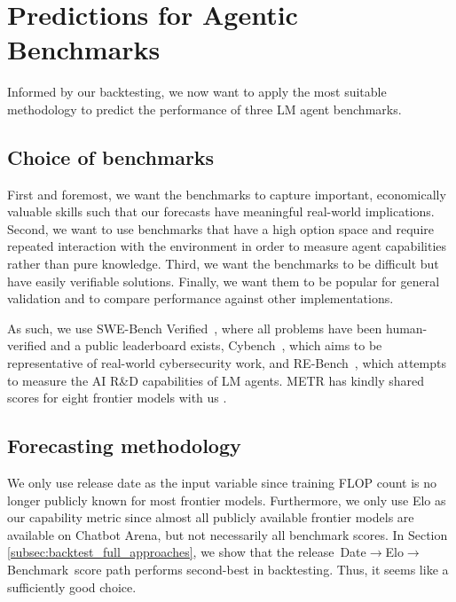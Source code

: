 \section{Predictions for Agentic Benchmarks}
\label{sec:agent_predictions}

Informed by our backtesting, we now want to apply the most suitable methodology to predict the performance of three LM agent benchmarks.  

\subsection{Choice of benchmarks}

First and foremost, we want the benchmarks to capture important, economically valuable skills such that our forecasts have meaningful real-world implications.
Second, we want to use benchmarks that have a high option space and require repeated interaction with the environment in order to measure agent capabilities rather than pure knowledge. 
Third, we want the benchmarks to be difficult but have easily verifiable solutions. 
Finally, we want them to be popular for general validation and to compare performance against other implementations.

As such, we use SWE-Bench Verified~\citep{jimenez2024swebenchlanguagemodelsresolve, openai2024swebenchverified}, where all problems have been human-verified and a public leaderboard exists, Cybench~\citep{zhang2024cybenchframeworkevaluatingcybersecurity}, which aims to be representative of real-world cybersecurity work, and RE-Bench~\citep{wijk2024rebenchevaluatingfrontierai}, which attempts to measure the AI R\&D capabilities of LM agents. METR has kindly shared scores for eight frontier models with us \cite{scorescore}.

\subsection{Forecasting methodology}
We only use release date as the input variable since training FLOP count is no longer publicly known for most frontier models.
Furthermore, we only use Elo as our capability metric since almost all publicly available frontier models are available on Chatbot Arena, but not necessarily all benchmark scores. 
In Section \ref{subsec:backtest_full_approaches}, we show that the release~Date$\to$Elo$\to$Benchmark~score path performs second-best in backtesting. Thus, it seems like a sufficiently good choice.

